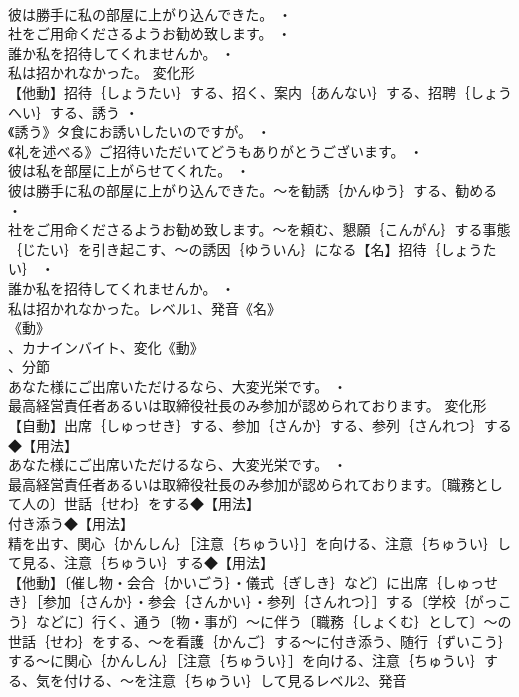 \documentclass[8pt]{extreport}
\begin{document}
\begin{CJK}{UTF8}{min}
\\	彼は勝手に私の部屋に上がり込んできた。 ・
\\	社をご用命くださるようお勧め致します。 ・
\\	誰か私を招待してくれませんか。 ・
\\	私は招かれなかった。	変化形 
\\	【他動】招待｛しょうたい｝する、招く、案内｛あんない｝する、招聘｛しょうへい｝する、誘う ・
\\	《誘う》タ食にお誘いしたいのですが。 ・
\\	《礼を述べる》ご招待いただいてどうもありがとうございます。 ・
\\	彼は私を部屋に上がらせてくれた。 ・
\\	彼は勝手に私の部屋に上がり込んできた。～を勧誘｛かんゆう｝する、勧める ・
\\	社をご用命くださるようお勧め致します。～を頼む、懇願｛こんがん｝する事態｛じたい｝を引き起こす、～の誘因｛ゆういん｝になる【名】招待｛しょうたい｝ ・
\\	誰か私を招待してくれませんか。 ・
\\	私は招かれなかった。レベル1、発音《名》
\\	《動》
\\	、カナインバイト、変化《動》
\\	、分節
\\	あなた様にご出席いただけるなら、大変光栄です。 ・
\\	最高経営責任者あるいは取締役社長のみ参加が認められております。	変化形 
\\	【自動】出席｛しゅっせき｝する、参加｛さんか｝する、参列｛さんれつ｝する◆【用法】
\\	あなた様にご出席いただけるなら、大変光栄です。 ・
\\	最高経営責任者あるいは取締役社長のみ参加が認められております。〔職務として人の〕世話｛せわ｝をする◆【用法】
\\	付き添う◆【用法】
\\	精を出す、関心｛かんしん｝［注意｛ちゅうい｝］を向ける、注意｛ちゅうい｝して見る、注意｛ちゅうい｝する◆【用法】
\\	【他動】〔催し物・会合｛かいごう｝・儀式｛ぎしき｝など〕に出席｛しゅっせき｝［参加｛さんか｝・参会｛さんかい｝・参列｛さんれつ｝］する〔学校｛がっこう｝などに〕行く、通う〔物・事が〕～に伴う〔職務｛しょくむ｝として〕～の世話｛せわ｝をする、～を看護｛かんご｝する～に付き添う、随行｛ずいこう｝する～に関心｛かんしん｝［注意｛ちゅうい｝］を向ける、注意｛ちゅうい｝する、気を付ける、～を注意｛ちゅうい｝して見るレベル2、発音

\end{CJK}
\end{document}
